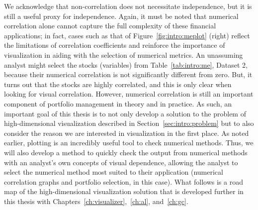 We acknowledge that non-correlation does not necessitate independence, but it 
is still a useful proxy for independence.
Again, it must be noted that numerical correlation alone cannot capture the 
full complexity of these financial applications; in fact, cases such as that of 
Figure~\ref{fig:intro:meplot} (right) reflect the limitations of correlation 
coefficients and reinforce the importance of visualization in aiding with the 
selection of numerical metrics. An unassuming 
analyst might select the stocks (variables) from Table~\ref{tab:intro:me}, 
Dataset 2, because their numerical correlation is not significantly different 
from zero. But, it turns out that the stocks are highly correlated, and this is 
only clear when looking for visual correlation. However, numerical correlation 
is still an important component of portfolio management in theory and in 
practice. 
As such, an important goal of this thesis is to not only develop a 
solution to the problem of high-dimensional visualization described in 
Section~\ref{sec:intro:problem} but to also consider the reason we are 
interested in visualization in the first place. As noted earlier, plotting is 
an incredibly useful tool to check numerical methods. Thus, we will also 
develop a method to quickly check the output from numerical methods with an 
analyst's own concepts of visual dependence, allowing the analyst to select the 
numerical method most suited to their application (numerical correlation graphs 
and portfolio selection, in this case). 
What follows is a road map of the high-dimensional visualization solution that 
is developed further in this thesis with 
Chapters~\ref{ch:visualizer},~\ref{ch:al}, and~\ref{ch:gc}.